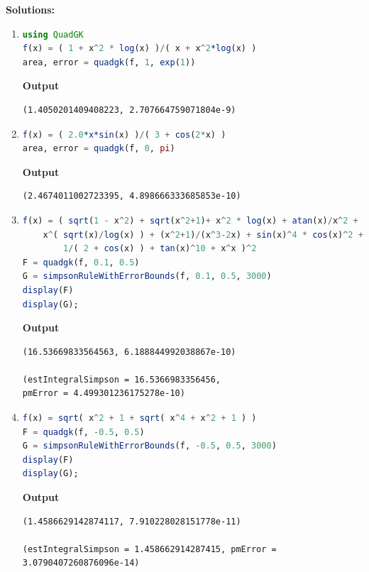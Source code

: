 \textbf{Solutions:}

\begin{enumerate}
\renewcommand{\labelenumi}{(\alph{enumi})}
\setlength{\itemsep}{.2cm}
    \item 

\begin{lstlisting}[language=Julia,style=mystyle]
using QuadGK
f(x) = ( 1 + x^2 * log(x) )/( x + x^2*log(x) )
area, error = quadgk(f, 1, exp(1))
\end{lstlisting}
\textbf{Output} 
\begin{verbatim}
(1.4050201409408223, 2.707664759071804e-9)
\end{verbatim}
    

    \item 

    
\begin{lstlisting}[language=Julia,style=mystyle]
f(x) = ( 2.0*x*sin(x) )/( 3 + cos(2*x) )
area, error = quadgk(f, 0, pi)
\end{lstlisting}
\textbf{Output} 
\begin{verbatim}
(2.4674011002723395, 4.898666333685853e-10)
\end{verbatim}

    \item 

    
\begin{lstlisting}[language=Julia,style=mystyle]
f(x) = ( sqrt(1 - x^2) + sqrt(x^2+1)+ x^2 * log(x) + atan(x)/x^2 + 
    x^( sqrt(x)/log(x) ) + (x^2+1)/(x^3-2x) + sin(x)^4 * cos(x)^2 +
        1/( 2 + cos(x) ) + tan(x)^10 + x^x )^2
F = quadgk(f, 0.1, 0.5)
G = simpsonRuleWithErrorBounds(f, 0.1, 0.5, 3000)
display(F)
display(G);
\end{lstlisting}
\textbf{Output} 
\begin{verbatim}
(16.53669833564563, 6.188844992038867e-10)

(estIntegralSimpson = 16.5366983356456, 
pmError = 4.499301236175278e-10)
\end{verbatim}

    \item 

    
\begin{lstlisting}[language=Julia,style=mystyle]
f(x) = sqrt( x^2 + 1 + sqrt( x^4 + x^2 + 1 ) )
F = quadgk(f, -0.5, 0.5)
G = simpsonRuleWithErrorBounds(f, -0.5, 0.5, 3000)
display(F)
display(G);
\end{lstlisting}
\textbf{Output} 
\begin{verbatim}
(1.4586629142874117, 7.910228028151778e-11)

(estIntegralSimpson = 1.458662914287415, pmError = 3.0790407260876096e-14)
\end{verbatim}
    
\end{enumerate}

